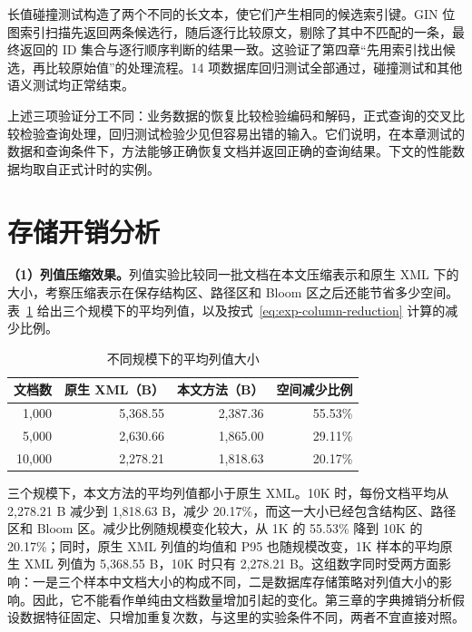 长值碰撞测试构造了两个不同的长文本，使它们产生相同的候选索引键。GIN 位图索引扫描先返回两条候选行，随后逐行比较原文，剔除了其中不匹配的一条，最终返回的 ID 集合与逐行顺序判断的结果一致。这验证了第四章“先用索引找出候选，再比较原始值”的处理流程。14 项数据库回归测试全部通过，碰撞测试和其他语义测试均正常结束。

上述三项验证分工不同：业务数据的恢复比较检验编码和解码，正式查询的交叉比较检验查询处理，回归测试检验少见但容易出错的输入。它们说明，在本章测试的数据和查询条件下，方法能够正确恢复文档并返回正确的查询结果。下文的性能数据均取自正式计时的实例。

\section{存储开销分析}
\textbf{（1）列值压缩效果。}列值实验比较同一批文档在本文压缩表示和原生 XML 下的大小，考察压缩表示在保存结构区、路径区和 Bloom 区之后还能节省多少空间。表~\ref{tab:exp-column-scales} 给出三个规模下的平均列值，以及按式~\eqref{eq:exp-column-reduction} 计算的减少比例。
\begin{table}[htbp]
\centering\small
\caption{不同规模下的平均列值大小}
\label{tab:exp-column-scales}
\begin{tabular}{rrrr}
\toprule
文档数 & 原生 XML（B） & 本文方法（B） & 空间减少比例 \\
\midrule
1,000 & 5,368.55 & 2,387.36 & 55.53\% \\
5,000 & 2,630.66 & 1,865.00 & 29.11\% \\
10,000 & 2,278.21 & 1,818.63 & 20.17\% \\
\bottomrule
\end{tabular}
\end{table}

三个规模下，本文方法的平均列值都小于原生 XML。10K 时，每份文档平均从 2,278.21 B 减少到 1,818.63 B，减少 20.17\%，而这一大小已经包含结构区、路径区和 Bloom 区。减少比例随规模变化较大，从 1K 的 55.53\% 降到 10K 的 20.17\%；同时，原生 XML 列值的均值和 P95 也随规模改变，1K 样本的平均原生 XML 列值为 5,368.55 B，10K 时只有 2,278.21 B。这组数字同时受两方面影响：一是三个样本中文档大小的构成不同，二是数据库存储策略对列值大小的影响。因此，它不能看作单纯由文档数量增加引起的变化。第三章的字典摊销分析假设数据特征固定、只增加重复次数，与这里的实验条件不同，两者不宜直接对照。

